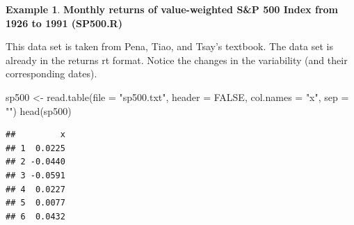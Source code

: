 \documentclass[
]{book}
\newenvironment{Shaded}{\begin{snugshade}}{\end{snugshade}}
\newcommand{\AttributeTok}[1]{\textcolor[rgb]{0.77,0.63,0.00}{#1}}
\newcommand{\ConstantTok}[1]{\textcolor[rgb]{0.00,0.00,0.00}{#1}}
\newcommand{\DecValTok}[1]{\textcolor[rgb]{0.00,0.00,0.81}{#1}}
\newcommand{\FunctionTok}[1]{\textcolor[rgb]{0.00,0.00,0.00}{#1}}
\newcommand{\NormalTok}[1]{#1}
\newcommand{\OtherTok}[1]{\textcolor[rgb]{0.56,0.35,0.01}{#1}}
\newcommand{\SpecialCharTok}[1]{\textcolor[rgb]{0.00,0.00,0.00}{#1}}
\newcommand{\StringTok}[1]{\textcolor[rgb]{0.31,0.60,0.02}{#1}}
\theoremstyle{definition}
\theoremstyle{definition}
\newtheorem{example}{Example}[chapter]
\theoremstyle{definition}
\theoremstyle{definition}
\theoremstyle{remark}
\begin{document}
\begin{example}
\textbf{Monthly returns of value-weighted S\&P 500 Index from 1926 to 1991 (SP500.R)}

This data set is taken from Pena, Tiao, and Tsay's textbook. The data set is already in the returns rt format. Notice the changes in the variability (and their corresponding dates).

\begin{Shaded}
\begin{Highlighting}[]
\NormalTok{sp500 }\OtherTok{\textless{}{-}} \FunctionTok{read.table}\NormalTok{(}\AttributeTok{file =} \StringTok{"sp500.txt"}\NormalTok{,}
          \AttributeTok{header =} \ConstantTok{FALSE}\NormalTok{, }\AttributeTok{col.names =} \StringTok{"x"}\NormalTok{, }\AttributeTok{sep =} \StringTok{""}\NormalTok{)}
\FunctionTok{head}\NormalTok{(sp500)}
\end{Highlighting}
\end{Shaded}

\begin{verbatim}
##         x
## 1  0.0225
## 2 -0.0440
## 3 -0.0591
## 4  0.0227
## 5  0.0077
## 6  0.0432
\end{verbatim}

\begin{Shaded}
\end{Shaded}


\end{example}
\end{document}
